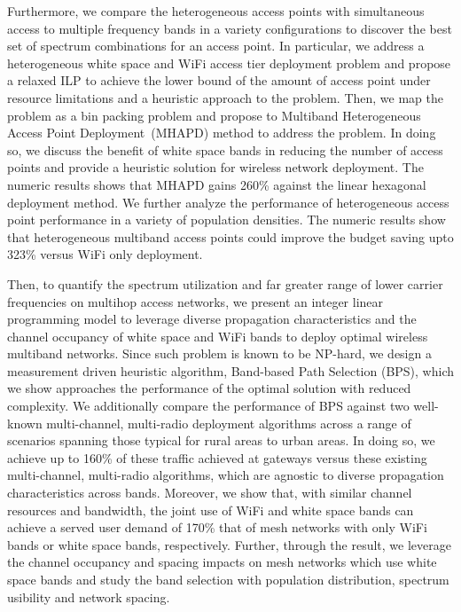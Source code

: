 Furthermore, we compare the heterogeneous access points with simultaneous access 
to multiple frequency bands in a variety configurations to discover the best set 
of spectrum combinations for an access point. In particular, we address a 
heterogeneous white space and WiFi access tier deployment problem and propose a 
relaxed ILP to achieve the lower bound of the amount of access point under resource 
limitations and a heuristic approach to the problem. Then, we map the problem as a 
bin packing problem and propose to Multiband Heterogeneous Access Point 
Deployment~(MHAPD) method to address the problem. In doing so, we discuss the benefit 
of white space bands in reducing the number of access points and provide a heuristic 
solution for wireless network deployment. The numeric results shows that MHAPD gains 
260\% against the linear hexagonal deployment method.  We further analyze the 
performance of heterogeneous access point performance in a variety of population 
densities. The numeric results show that heterogeneous multiband access points could 
improve the budget saving upto 323\% versus WiFi only deployment. 

Then, to quantify the spectrum utilization and far greater range of lower carrier 
frequencies on multihop access networks, we present an integer linear programming 
model to leverage diverse propagation characteristics and the channel occupancy of 
white space and WiFi bands to deploy optimal wireless multiband networks. Since 
such problem is known to be NP-hard, we design a measurement driven heuristic 
algorithm, Band-based Path Selection (BPS), which we show approaches the performance 
of the optimal solution with reduced complexity.  We additionally compare the 
performance of BPS against two well-known multi-channel, multi-radio deployment 
algorithms across a range of scenarios spanning those typical for rural areas to 
urban areas. In doing so, we achieve up to 160\% of these traffic achieved at gateways 
versus these existing multi-channel, multi-radio algorithms, which are agnostic to 
diverse propagation characteristics across bands.  Moreover, we show that, with similar 
channel resources and bandwidth, the joint use of WiFi and white space bands can achieve 
a served user demand of 170\% that of mesh networks with only WiFi bands or white space 
bands, respectively. Further, through the result, we leverage the channel occupancy and 
spacing impacts on mesh networks which use white space bands and study the band selection
with population distribution, spectrum usibility and network spacing.

